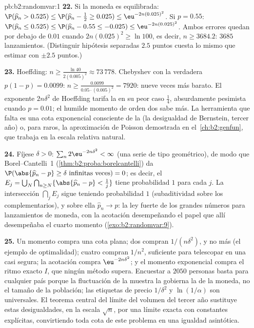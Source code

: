 \begin{solution}{pb:b2:randomvar:1}
\textbf{22.} Si la moneda es equilibrada: $\P(\widehat p_n > 0.525)
\leq \P(\widehat p_n - \tfrac12 \geq 0.025) \leq
\eu^{-2n(0.025)^2}$. Si $p = 0.55$: $\P(\widehat p_n \leq 0.525) \leq
\P(\widehat p_n - 0.55 \leq -0.025) \leq \eu^{-2n(0.025)^2}$. Ambos
errores quedan por debajo de $0.01$ cuando $2n(0.025)^2 \geq \ln
100$, es decir, $n \geq 3684.2$: $3685$ lanzamientos. (Distinguir
hipótesis separadas $2.5$ puntos cuesta lo mismo que estimar con
$\pm2.5$ puntos.)

\textbf{23.} Hoeffding: $n \geq \frac{\ln 40}{2(0.005)^2} \approx
73\,778$. Chebyshev con la  verdadera $p(1-p) = 0.0099$: $n
\geq \frac{0.0099}{0.05\cdot(0.005)^2} = 7920$: nueve veces más
barato. El exponente $2n\delta^2$ de Hoeffding tarifa la  en
su peor caso $\frac14$, absurdamente pesimista cuando $p = 0.01$; el
humilde momento de orden dos sabe más. La herramienta que falta es
una cota exponencial consciente de la  (la desigualdad de
Bernstein, tercer año) o, para  raros, la aproximación de
Poisson demostrada en el~\cref{ch:b2:genfun}, que trabaja en la
escala relativa natural.

\textbf{24.} Fíjese $\delta > 0$: $\sum_n 2\eu^{-2n\delta^2} <
\infty$ (una serie de tipo geométrico), de modo que Borel--Cantelli~1
(\cref{thm:b2:proba:borelcantelli}) da $\P(\abs{\widehat p_n - p}
\geq \delta \text{ infinitas veces}) = 0$; es decir, el  $E_j =
\bigcup_N\bigcap_{n\geq N}\{\abs{\widehat p_n - p} < \tfrac1j\}$
tiene probabilidad $1$ para cada $j$. La intersección 
$\bigcap_jE_j$ sigue teniendo probabilidad $1$ (subaditividad sobre
los complementarios), y sobre ella $\widehat p_n \to p$: la ley
fuerte de los grandes números para lanzamientos de moneda, con la
acotación desempeñando el papel que allí desempeñaba el cuarto
momento (\cref{exo:b2:randomvar:9}).

\textbf{25.} Un momento compra una cota plana; dos compran
$1/(n\delta^2)$, y no más (el ejemplo de optimalidad); cuatro compran
$1/n^2$, suficiente para telescopar en una  casi segura; la
acotación compra $\eu^{-2n\delta^2}$; y el momento exponencial
 compra el ritmo exacto $I$, que ningún método supera.
Encuestar a $2050$ personas basta para cualquier país porque la
fluctuación de la muestra la gobierna la  de la moneda, no
el tamaño de la población; las etiquetas de precio $1/\delta^2$ y
$\ln(1/\alpha)$ son universales. El teorema central del límite del
volumen del tercer año sustituye estas desigualdades, en la escala
$\sqrt n$, por una  límite exacta con constantes explícitas,
convirtiendo toda cota de este problema en una igualdad asintótica.
\end{solution}
